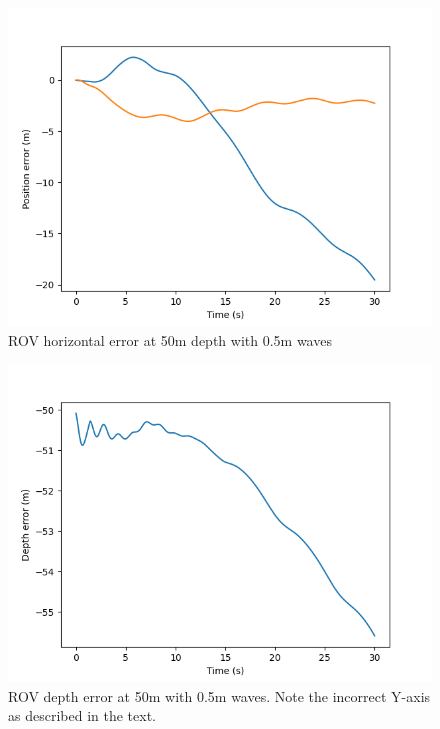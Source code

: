 \documentclass[class=article, crop=false]{standalone}
\begin{document}
\begin{figure}
    \centering
    \includegraphics{scenario1/rov-50m/0.5m/rov_position_error_uncontrolled}
    \caption{ROV horizontal error at 50m depth with 0.5m waves}
    \label{fig:rov_xy_error}
\end{figure}

\begin{figure}
    \centering
    \includegraphics{scenario1/rov-50m/0.5m/rov_depth_error_uncontrolled}
    \caption{ROV depth error at 50m with 0.5m waves. Note the incorrect Y-axis as described in the text.}
\end{figure}
\end{document}
